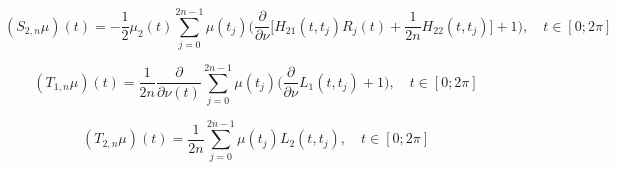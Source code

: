 \documentclass[a4 paper,12pt,ukrainian]{report}
\begin{document}
\begin{equation*}
(S_{2,n}\mu)(t)=-\frac{1}{2}\mu_2(t)\sum\limits_{j=0}^{2n-1} \mu(t_{j})\bigg(\frac{\partial}{\partial\nu}\Big[H_{21}(t,t_j)R_j(t)+\frac{1}{2n}H_{22}(t,t_j)\Big] + 1\bigg), \quad t\in[0;2\pi]
\end{equation*}

\begin{equation*}
(T_{1,n}\mu)(t)=\frac{1}{2n}\frac{\partial}{\partial\nu(t)}\sum\limits_{j=0}^{2n-1}\mu(t_j)\bigg(\frac{\partial}{\partial\nu}L_{1}(t,t_j) + 1\bigg), \quad t\in[0;2\pi]
\end{equation*}

\begin{equation*}
(T_{2,n}\mu)(t)=\frac{1}{2n}\sum\limits_{j=0}^{2n-1}\mu(t_j)L_{2}(t,t_j), \quad t\in[0;2\pi]
\end{equation*}
\end{document}
